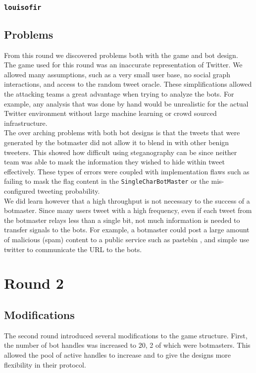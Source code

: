 \documentclass[11pt, oneside]{article} %
\numberwithin{equation}{section} %
\numberwithin{figure}{section} %
\numberwithin{table}{section} %
\renewcommand{\c}[1]{\texttt{#1}}
\newcommand{\teamol}{\c{louisofir}}
\begin{document}
		\subsubsection{\teamol}

	\subsection{Problems}
		From this round we discovered problems both with the game and bot design. \\

		The game used for this round was an inaccurate representation of Twitter. We allowed many assumptions, such as a very small user base, no social graph interactions, and access to the random tweet oracle. These simplifications allowed the attacking teams a great advantage when trying to analyze the bots. For example, any analysis that was done by hand would be unrealistic for the actual Twitter environment without large machine learning or crowd sourced infrastructure. \\ 
		
		The over arching problems with both bot designs is that the tweets that were generated by the botmaster did not allow it to blend in with other benign tweeters. This showed how difficult using steganography can be since neither team was able to mask the information they wished to hide within tweet effectively.  These types of errors were coupled with implementation flaws such as failing to mask the flag content in the \c{SingleCharBotMaster} or the mis-configured tweeting probability. \\

		We did learn however that a high throughput is not necessary to the success of a botmaster. Since many users tweet with a high frequency, even if each tweet from the botmaster relays less than a single bit, not much information is needed to transfer signals to the bots. For example, a botmaster could post a large amount of malicious (spam) content to a public service such as pastebin \cite{pastebin} , and simple use twitter to communicate the URL to the bots. \\


\section{Round 2}
	\subsection{Modifications}
		The second round introduced several modifications to the game structure. First, the number of bot handles was increased to 20, 2 of which were botmasters. This allowed the pool of active handles to increase and to give the designs more flexibility in their protocol. \\
\end{document}
